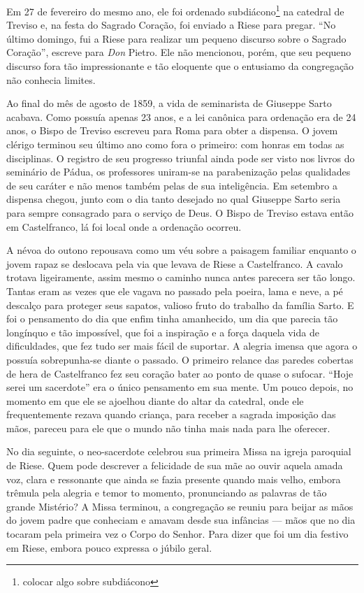 \documentclass[12pt,a4paper,oneside]{book}
\begin{document}
\quad Em 27 de fevereiro do mesmo ano, ele foi ordenado subdiácono\footnote[3]{colocar algo sobre subdiácono} na catedral de Treviso e, na festa do Sagrado Coração, foi enviado a Riese para pregar. ``No último domingo, fui a Riese para realizar um pequeno discurso sobre o Sagrado Coração'', escreve para \emph{Don} Pietro. Ele não mencionou, porém, que seu pequeno discurso fora tão impressionante e tão eloquente que o entusiamo da congregação não conhecia limites.

\quad Ao final do mês de agosto de 1859, a vida de seminarista de Giuseppe Sarto acabava. Como possuía apenas 23 anos, e a lei canônica para ordenação era de 24 anos, o Bispo de Treviso escreveu para Roma para obter a dispensa. O jovem clérigo terminou seu último ano como fora o primeiro: com honras em todas as disciplinas. O registro de seu progresso triunfal ainda pode ser visto nos livros do seminário de Pádua, os professores uniram-se na parabenização pelas qualidades de seu caráter e não menos também pelas de sua inteligência. Em setembro a dispensa chegou, junto com o dia tanto desejado no qual Giuseppe Sarto seria para sempre consagrado para o serviço de Deus. O Bispo de Treviso estava então em Castelfranco, lá foi local onde a ordenação ocorreu.

\quad A névoa do outono repousava como um véu sobre a paisagem familiar enquanto o jovem rapaz se deslocava pela via que levava de Riese a Castelfranco. A cavalo trotava ligeiramente, assim mesmo o caminho nunca antes parecera ser tão longo. Tantas eram as vezes que ele vagava no passado pela poeira, lama e neve, a pé descalço para proteger seus sapatos, valioso fruto do trabalho da família Sarto. E foi o pensamento do dia que enfim tinha amanhecido, um dia que parecia tão longínquo e tão impossível, que foi a inspiração e a força daquela vida de dificuldades, que fez tudo ser mais fácil de suportar. A alegria imensa que agora o possuía sobrepunha-se diante o passado. O primeiro relance das paredes cobertas de hera de Castelfranco fez seu coração bater ao ponto de quase o sufocar. ``Hoje serei um sacerdote'' era o único pensamento em sua mente. Um pouco depois, no momento em que ele se ajoelhou diante do altar da catedral, onde ele frequentemente rezava quando criança, para receber a sagrada imposição das mãos, pareceu para ele que o mundo não tinha mais nada para lhe oferecer.

\quad No dia seguinte, o neo-sacerdote celebrou sua primeira Missa na igreja paroquial de Riese. Quem pode descrever a felicidade de sua mãe ao ouvir aquela amada voz, clara e ressonante que ainda se fazia presente quando mais velho, embora trêmula pela alegria e temor to momento, pronunciando as palavras de tão grande Mistério? A Missa terminou, a congregação se reuniu para beijar as mãos do jovem padre que conheciam e amavam desde sua infâncias --- mãos que no dia tocaram pela primeira vez o Corpo do Senhor. Para dizer que foi um dia festivo em Riese, embora pouco expressa o júbilo geral.
\end{document}
